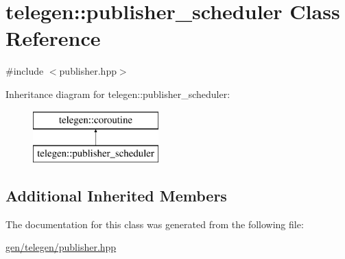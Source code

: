 \hypertarget{classtelegen_1_1publisher__scheduler}{}\section{telegen\+:\+:publisher\+\_\+scheduler Class Reference}
\label{classtelegen_1_1publisher__scheduler}


{\ttfamily \#include $<$publisher.\+hpp$>$}

Inheritance diagram for telegen\+:\+:publisher\+\_\+scheduler\+:\begin{figure}[H]
\begin{center}
\leavevmode
\includegraphics[height=2.000000cm]{classtelegen_1_1publisher__scheduler}
\end{center}
\end{figure}
\subsection*{Additional Inherited Members}


The documentation for this class was generated from the following file\+:\begin{DoxyCompactItemize}
\item 
\hyperlink{gen_2telegen_2publisher_8hpp}{gen/telegen/publisher.\+hpp}\end{DoxyCompactItemize}
